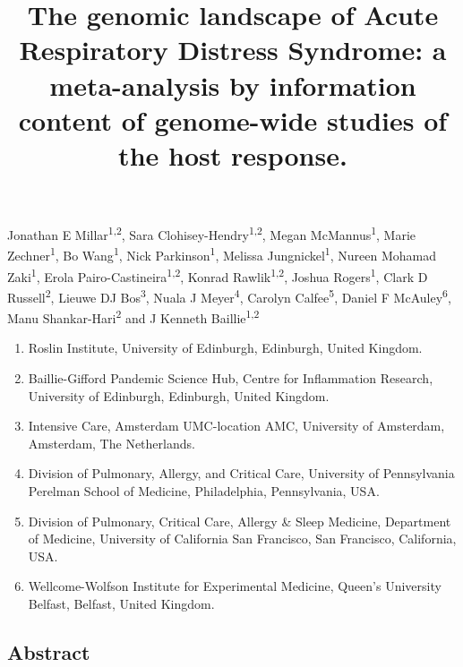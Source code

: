 \documentclass[
  11,
  a4paper,
]{article}
\title{The genomic landscape of Acute Respiratory Distress Syndrome: a
meta-analysis by information content of genome-wide studies of the host
response.}
\author{}
\date{}
\providecommand{\tightlist}{%
  \setlength{\itemsep}{0pt}\setlength{\parskip}{0pt}}\usepackage{longtable,booktabs,array}
\begin{document}
\maketitle
\ifdefined\Shaded\renewenvironment{Shaded}{\begin{tcolorbox}[sharp corners, frame hidden, borderline west={3pt}{0pt}{shadecolor}, enhanced, interior hidden, boxrule=0pt, breakable]}{\end{tcolorbox}}\fi

Jonathan E Millar\textsuperscript{1,2}, Sara
Clohisey-Hendry\textsuperscript{1,2}, Megan McMannus\textsuperscript{1},
Marie Zechner\textsuperscript{1}, Bo Wang\textsuperscript{1}, Nick
Parkinson\textsuperscript{1}, Melissa Jungnickel\textsuperscript{1},
Nureen Mohamad Zaki\textsuperscript{1}, Erola
Pairo-Castineira\textsuperscript{1,2}, Konrad
Rawlik\textsuperscript{1,2}, Joshua Rogers\textsuperscript{1}, Clark D
Russell\textsuperscript{2}, Lieuwe DJ Bos\textsuperscript{3}, Nuala J
Meyer\textsuperscript{4}, Carolyn Calfee\textsuperscript{5}, Daniel F
McAuley\textsuperscript{6}, Manu Shankar-Hari\textsuperscript{2} and J
Kenneth Baillie\textsuperscript{1,2}

\begin{enumerate}
\def\labelenumi{\arabic{enumi}.}
\tightlist
\item
  Roslin Institute, University of Edinburgh, Edinburgh, United Kingdom.
\item
  Baillie-Gifford Pandemic Science Hub, Centre for Inflammation
  Research, University of Edinburgh, Edinburgh, United Kingdom.
\item
  Intensive Care, Amsterdam UMC-location AMC, University of Amsterdam,
  Amsterdam, The Netherlands.
\item
  Division of Pulmonary, Allergy, and Critical Care, University of
  Pennsylvania Perelman School of Medicine, Philadelphia, Pennsylvania,
  USA.
\item
  Division of Pulmonary, Critical Care, Allergy \& Sleep Medicine,
  Department of Medicine, University of California San Francisco, San
  Francisco, California, USA.
\item
  Wellcome-Wolfson Institute for Experimental Medicine, Queen's
  University Belfast, Belfast, United Kingdom.
\end{enumerate}

\newpage

\hypertarget{abstract}{%
\subsection{Abstract}\label{abstract}}
\end{document}
